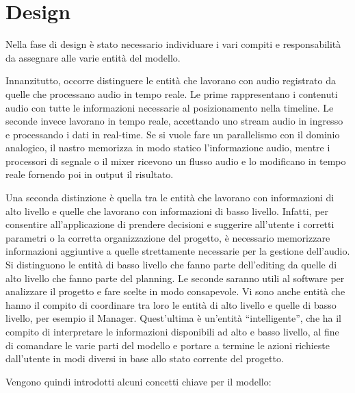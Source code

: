 \documentclass[a4paper,12pt]{report}
\begin{document}
\chapter{Design}
Nella fase di design è stato necessario individuare i vari compiti e responsabilità da assegnare alle varie entità del modello.

Innanzitutto, occorre distinguere le entità che lavorano con audio registrato da quelle che processano audio in tempo reale.
Le prime rappresentano i contenuti audio con tutte le informazioni necessarie al posizionamento nella timeline. Le seconde invece lavorano in tempo reale, accettando uno stream audio in ingresso e processando i dati in real-time.
Se si vuole fare un parallelismo con il dominio analogico, il nastro memorizza in modo statico l’informazione audio, mentre i processori di segnale o il mixer ricevono un flusso audio e lo modificano in tempo reale fornendo poi in output il risultato.

Una seconda distinzione è quella tra le entità che lavorano con informazioni di alto livello e quelle che lavorano con informazioni di basso livello.
Infatti, per consentire all’applicazione di prendere decisioni e suggerire all’utente i corretti parametri o la corretta organizzazione del progetto, è necessario memorizzare informazioni aggiuntive a quelle strettamente necessarie per la gestione dell’audio.
Si distinguono le entità di basso livello che fanno parte dell’editing da quelle di alto livello che fanno parte del planning. Le seconde saranno utili al software per analizzare il progetto e fare scelte in modo consapevole.
Vi sono anche entità che hanno il compito di coordinare tra loro le entità di alto livello e quelle di basso livello, per esempio il Manager.
Quest’ultima è un'entità “intelligente”, che ha il compito di interpretare le informazioni disponibili ad alto e basso livello, al fine di comandare le varie parti del modello e portare a termine le azioni richieste dall’utente in modi diversi in base allo stato corrente del progetto.

\parskip 0.8in
Vengono quindi introdotti alcuni concetti chiave per il modello:
\parskip 0in
\end{document}
